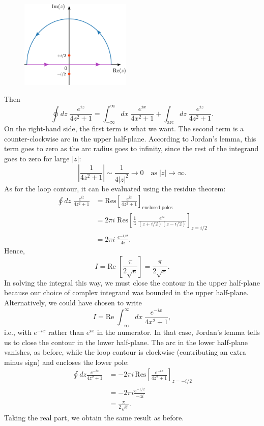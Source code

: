 \documentclass[10pt,a4paper]{article}
\begin{document}
\begin{figure}[ht]
  \centering\includegraphics[width=0.47\textwidth]{contour_example3}
\end{figure}

\noindent
Then
\begin{equation}
\oint dz \; \frac{e^{iz}}{4z^2 + 1} = \int_{-\infty}^\infty dx\; \frac{e^{ix}}{4x^2 + 1} + \int_{\mathrm{arc}} dz \; \frac{e^{iz}}{4z^2 + 1}.
\end{equation}
On the right-hand side, the first term is what we want. The second
term is a counter-clockwise arc in the upper half-plane. According to
Jordan's lemma, this term goes to zero as the arc radius goes to
infinity, since the rest of the integrand goes to zero for large
$|z|$:
\begin{equation}
\left|\frac{1}{4z^2 + 1}\right| \sim \frac{1}{4|z|^2} \rightarrow 0 \quad \mathrm{as} \;|z| \rightarrow \infty.
\end{equation}
As for the loop contour, it can be evaluated using the residue
theorem:
\begin{align}
  \oint dz \; \frac{e^{iz}}{4z^2 + 1}
  &= \mathrm{Res}\left[\frac{e^{iz}}{4z^2 + 1}\right]_{\mathrm{enclosed}\;\mathrm{poles}}\\
  &= 2\pi i \; \mathrm{Res}\left[\frac{1}{4}\, \frac{e^{iz}}{(z+i/2)(z-i/2)}\right]_{z = i/2} \\
  &= 2\pi i \; \frac{e^{-1/2}}{4i}.
\end{align}
Hence,
\begin{equation}
I = \mathrm{Re}\;\left[\frac{\pi}{2\sqrt{e}}\right]= \frac{\pi}{2\sqrt{e}}.
\end{equation}
In solving the integral this way, we must close the contour in the upper
half-plane because our choice of complex integrand was bounded in the
upper half-plane. Alternatively, we could have chosen to write
\begin{equation}
I = \mathrm{Re} \; \int_{-\infty}^\infty dx\; \frac{e^{-ix}}{4x^2 + 1},
\end{equation}
i.e., with $e^{-ix}$ rather than $e^{ix}$ in the numerator. In that
case, Jordan's lemma tells us to close the contour in the lower
half-plane. The arc in the lower half-plane vanishes, as before, while
the loop contour is clockwise (contributing an extra minus sign) and
encloses the lower pole:
\begin{align}
  \oint dz \frac{e^{-iz}}{4z^2 + 1}
  &= -2\pi i \, \mathrm{Res}\left[ \frac{e^{-iz}}{4z^2 + 1} \right]_{z = -i/2} \\
  &= - 2\pi i \frac{e^{-1/2}}{-4i} \\
  &= \frac{\pi}{2\sqrt{e}}.
\end{align}
Taking the real part, we obtain the same result as before.
\end{document}
